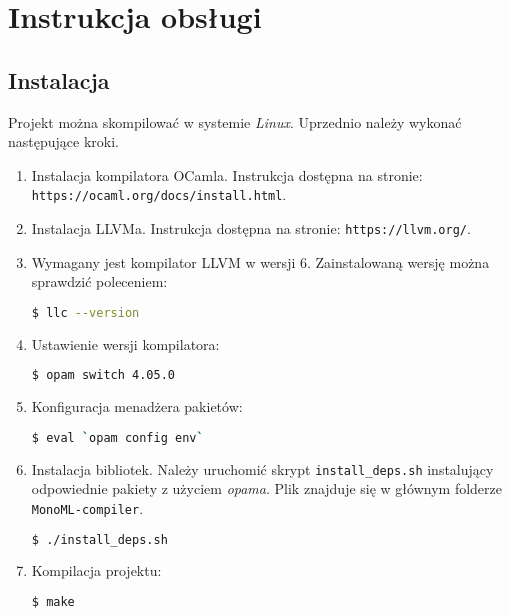 \documentclass[declaration,shortabstract]{iithesis}
\begin{document}

\chapter{Instrukcja obsługi}

\section{Instalacja}

Projekt można skompilować w systemie \textit{Linux}.
Uprzednio należy wykonać następujące kroki. 

\begin{enumerate}
  \item Instalacja kompilatora OCamla. Instrukcja dostępna na stronie: \newline
  \texttt{https://ocaml.org/docs/install.html}.
  \item Instalacja LLVMa. Instrukcja dostępna na stronie: \newline
  \texttt{https://llvm.org/}.
  \item Wymagany jest kompilator LLVM w wersji $6$. Zainstalowaną 
  wersję można sprawdzić poleceniem:
  \begin{lstlisting}[language=bash]
  $ llc --version
  \end{lstlisting}
  \item Ustawienie wersji kompilatora:
  \begin{lstlisting}[language=bash]
  $ opam switch 4.05.0
  \end{lstlisting}
  \item Konfiguracja menadżera pakietów:
  \begin{lstlisting}[language=bash]
  $ eval `opam config env`
  \end{lstlisting}
  \item Instalacja bibliotek. Należy uruchomić skrypt \texttt{install\_deps.sh}
   instalujący odpowiednie pakiety z użyciem \textit{opama}. Plik znajduje się 
   w głównym folderze 
  \texttt{MonoML-compiler}. 
  \begin{lstlisting}[language=bash]
  $ ./install_deps.sh
  \end{lstlisting}
  \item Kompilacja projektu:
  \begin{lstlisting}[language=bash]
  $ make 
  \end{lstlisting}
\end{enumerate}
\end{document}
